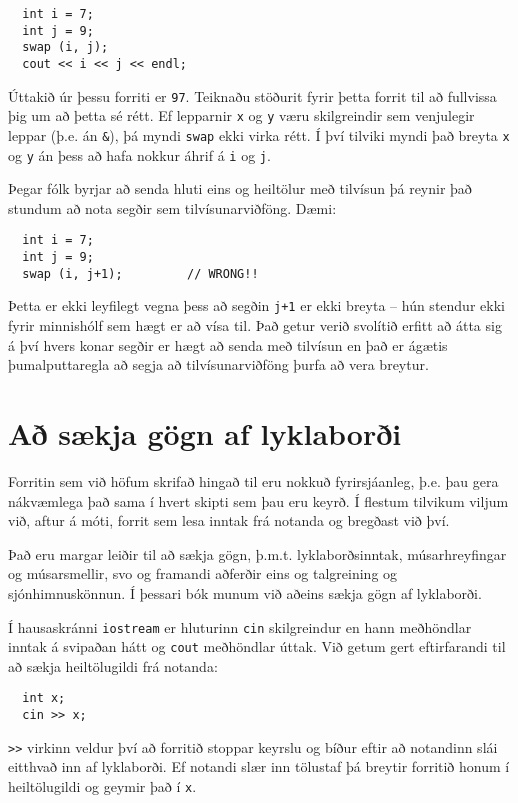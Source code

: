 \begin{verbatim}
  int i = 7;
  int j = 9;
  swap (i, j);
  cout << i << j << endl;
\end{verbatim}
%
Úttakið úr þessu forriti er {\tt 97}.
Teiknaðu stöðurit fyrir þetta forrit til að fullvissa þig um að þetta sé rétt.
Ef lepparnir {\tt x} og {\tt y} væru skilgreindir sem venjulegir leppar (þ.e. án {\tt \&}), þá myndi {\tt swap} ekki virka rétt.
Í því tilviki myndi það breyta {\tt x} og {\tt y} án þess að hafa nokkur áhrif á {\tt i} og {\tt j}.

Þegar fólk byrjar að senda hluti eins og heiltölur með tilvísun þá reynir það stundum að nota segðir sem tilvísunarviðföng.
Dæmi:

\begin{verbatim}
  int i = 7;
  int j = 9;
  swap (i, j+1);         // WRONG!!
\end{verbatim}
%
Þetta er ekki leyfilegt vegna þess að segðin {\tt j+1} er ekki breyta -- hún stendur ekki fyrir minnishólf sem hægt er að vísa til.
Það getur verið svolítið erfitt að átta sig á því hvers konar segðir er hægt að senda með tilvísun en það er ágætis þumalputtaregla að segja að tilvísunarviðföng þurfa að vera breytur.

\section{Að sækja gögn af lyklaborði}
\label{input}

Forritin sem við höfum skrifað hingað til eru nokkuð fyrirsjáanleg, þ.e. þau gera nákvæmlega það sama í hvert skipti sem þau eru keyrð.
Í flestum tilvikum viljum við, aftur á móti, forrit sem lesa inntak frá notanda og bregðast við því.

Það eru margar leiðir til að sækja gögn, þ.m.t. lyklaborðsinntak, músarhreyfingar og músarsmellir, svo og framandi aðferðir eins og talgreining og sjónhimnuskönnun.
Í þessari bók munum við aðeins sækja gögn af lyklaborði.


Í hausaskránni {\tt iostream} er hluturinn {\tt cin} skilgreindur en hann meðhöndlar inntak á svipaðan hátt og {\tt cout} meðhöndlar úttak.
Við getum gert eftirfarandi til að sækja heiltölugildi frá notanda:

\begin{verbatim}
  int x;
  cin >> x;
\end{verbatim}
%
{\tt >>} virkinn veldur því að forritið stoppar keyrslu og bíður eftir að notandinn slái eitthvað inn af lyklaborði.
Ef notandi slær inn tölustaf þá breytir forritið honum í heiltölugildi og geymir það í {\tt x}.


